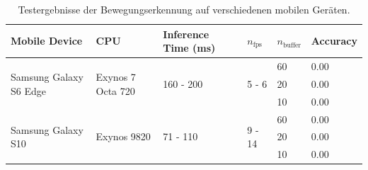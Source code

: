 \begin{table}
    \footnotesize
    \begin{tabularx}{\textwidth}{l|l|l|l|l|l}
        \hline
        Mobile Device & CPU & Inference Time (ms) & $n_\mathrm{fps}$ & $n_\mathrm{buffer}$ & Accuracy \\ \hline

        \multirow{3}{*}{Samsung Galaxy S6 Edge} & \multirow{3}{*}{Exynos 7 Octa 720} & \multirow{3}{*}{160 - 200} & \multirow{3}{*}{5 - 6} & 60 & 0.00 \\ \cline{5-6}
        & & & & 20 & 0.00 \\ \cline{5-6}
        & & & & 10 & 0.00 \\ \hline

        \multirow{3}{*}{Samsung Galaxy S10} & \multirow{3}{*}{Exynos 9820} & \multirow{3}{*}{71 - 110} & \multirow{3}{*}{9 - 14} & 60 & 0.00  \\ \cline{5-6}
        & & & & 20 & 0.00 \\ \cline{5-6}
        & & & & 10 & 0.00 \\ \hline
    \end{tabularx}
    \caption{Testergebnisse der Bewegungserkennung auf verschiedenen mobilen Geräten.}
    \label{table:android-tests}
\end{table}
